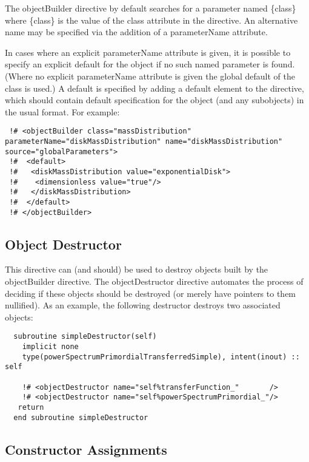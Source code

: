 The {\normalfont \ttfamily objectBuilder} directive by default searches for a parameter named {\normalfont \ttfamily \{class\}} where {\normalfont \ttfamily \{class\}} is the value of the {\normalfont \ttfamily class} attribute in the directive. An alternative name may be specified via the addition of a {\normalfont \ttfamily parameterName} attribute.

In cases where an explicit {\normalfont \ttfamily parameterName} attribute is given, it is possible to specify an explicit default for the object if no such named parameter is found. (Where no explicit {\normalfont \ttfamily parameterName} attribute is given the global default of the class is used.) A default is specified by adding a {\normalfont \ttfamily default} element to the directive, which should contain default specification for the object (and any subobjects) in the usual format. For example:
\begin{verbatim}
 !# <objectBuilder class="massDistribution" parameterName="diskMassDistribution" name="diskMassDistribution" source="globalParameters">
 !#  <default>
 !#   <diskMassDistribution value="exponentialDisk">
 !#    <dimensionless value="true"/>
 !#   </diskMassDistribution>
 !#  </default>
 !# </objectBuilder>
\end{verbatim}

\subsection{Object Destructor}

This directive can (and should) be used to destroy objects built by the {\normalfont \ttfamily objectBuilder} directive. The {\normalfont \ttfamily objectDestructor} directive automates the process of deciding if these objects should be destroyed (or merely have pointers to them nullified). As an example, the following destructor destroys two associated objects:
\begin{lstlisting}  
  subroutine simpleDestructor(self)
    implicit none
    type(powerSpectrumPrimordialTransferredSimple), intent(inout) :: self

    !# <objectDestructor name="self%transferFunction_"       />
    !# <objectDestructor name="self%powerSpectrumPrimordial_"/>
   return
  end subroutine simpleDestructor
\end{lstlisting}

\subsection{Constructor Assignments}

